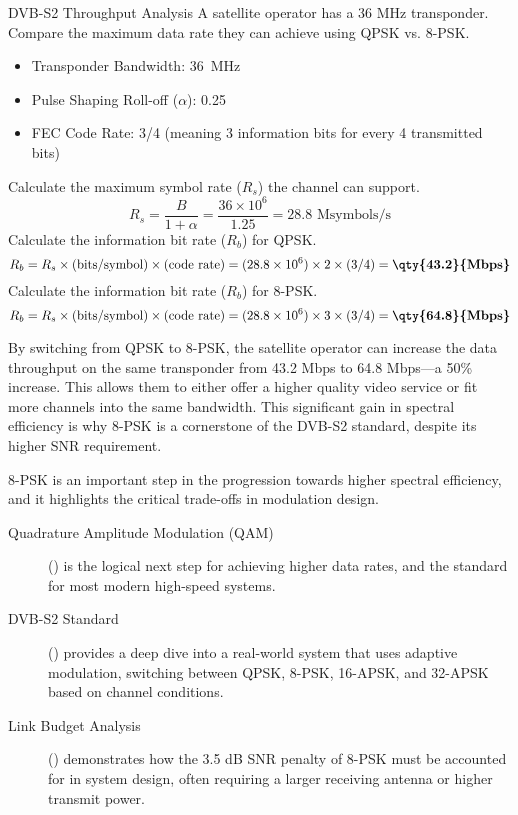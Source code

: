 \begin{workedexample}{DVB-S2 Throughput Analysis}
     A satellite operator has a 36 MHz transponder. Compare the maximum data rate they can achieve using QPSK vs. 8-PSK.
    \begin{itemize}
        \item Transponder Bandwidth: \qty{36}{MHz}
        \item Pulse Shaping Roll-off ($\alpha$): 0.25
        \item FEC Code Rate: 3/4 (meaning 3 information bits for every 4 transmitted bits)
    \end{itemize}
    \begin{derivationsteps}
        \step Calculate the maximum symbol rate ($R_s$) the channel can support.
        \[ R_s = \frac{B}{1+\alpha} = \frac{36 \times 10^6}{1.25} = 28.8 \text{ Msymbols/s} \]
        \step Calculate the information bit rate ($R_b$) for QPSK.
        \[ R_b = R_s \times (\text{bits/symbol}) \times (\text{code rate}) = (28.8 \times 10^6) \times 2 \times (3/4) = \textbf{\qty{43.2}{Mbps}} \]
        \step Calculate the information bit rate ($R_b$) for 8-PSK.
        \[ R_b = R_s \times (\text{bits/symbol}) \times (\text{code rate}) = (28.8 \times 10^6) \times 3 \times (3/4) = \textbf{\qty{64.8}{Mbps}} \]
    \end{derivationsteps}
     By switching from QPSK to 8-PSK, the satellite operator can increase the data throughput on the same transponder from 43.2 Mbps to 64.8 Mbps---a 50\% increase. This allows them to either offer a higher quality video service or fit more channels into the same bandwidth. This significant gain in spectral efficiency is why 8-PSK is a cornerstone of the DVB-S2 standard, despite its higher SNR requirement.
\end{workedexample}


\begin{importantbox}[title={Further Reading}]
    8-PSK is an important step in the progression towards higher spectral efficiency, and it highlights the critical trade-offs in modulation design.
    \begin{description}
        \item[Quadrature Amplitude Modulation (QAM)] () is the logical next step for achieving higher data rates, and the standard for most modern high-speed systems.
        \item[DVB-S2 Standard] () provides a deep dive into a real-world system that uses adaptive modulation, switching between QPSK, 8-PSK, 16-APSK, and 32-APSK based on channel conditions.
        \item[Link Budget Analysis] () demonstrates how the 3.5 dB SNR penalty of 8-PSK must be accounted for in system design, often requiring a larger receiving antenna or higher transmit power.
    \end{description}
\end{importantbox}